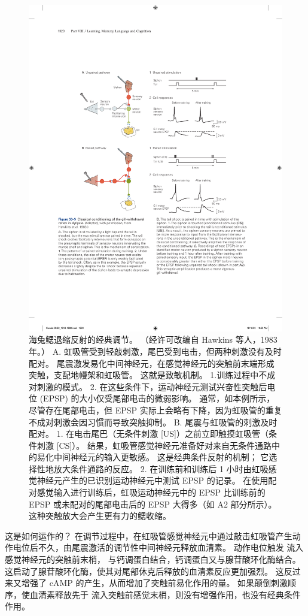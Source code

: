 \begin{figure}[htbp]
	\centering
	\includegraphics[width=0.75\linewidth]{chap53/fig_53_5}
	\caption{海兔鳃退缩反射的经典调节。 （经许可改编自 Hawkins 等人，1983 年。） A. 虹吸管受到轻敲刺激，尾巴受到电击，但两种刺激没有及时配对。 尾震激发易化中间神经元，在感觉神经元的突触前末端形成突触，支配地幔架和虹吸管。 这就是致敏机制。 1.训练过程中不成对刺激的模式。 2. 在这些条件下，运动神经元测试兴奋性突触后电位 (EPSP) 的大小仅受尾部电击的微弱影响。 通常，如本例所示，尽管存在尾部电击，但 EPSP 实际上会略有下降，因为虹吸管的重复不成对刺激会因习惯而导致突触抑制。 B. 尾震与虹吸管的刺激及时配对。 1. 在电击尾巴（无条件刺激 [US]）之前立即触摸虹吸管（条件刺激 [CS]）。 结果，虹吸管感觉神经元准备好对来自无条件通路中的易化中间神经元的输入更敏感。 这是经典条件反射的机制； 它选择性地放大条件通路的反应。 2. 在训练前和训练后 1 小时由虹吸感觉神经元产生的已识别运动神经元中测试 EPSP 的记录。 在使用配对感觉输入进行训练后，虹吸运动神经元中的 EPSP 比训练前的 EPSP 或未配对的尾部电击后的 EPSP 大得多（如 A2 部分所示）。 这种突触放大会产生更有力的鳃收缩。}
	\label{fig:53_5}
\end{figure}


这是如何运作的？
在调节过程中，在虹吸管感觉神经元中通过敲击虹吸管产生动作电位后不久，由尾震激活的调节性中间神经元释放血清素。
动作电位触发  流入感觉神经元的突触前末梢， 与钙调蛋白结合，钙调蛋白又与腺苷酸环化酶结合。
这启动了腺苷酸环化酶，使其对尾部休克后释放的血清素反应更加强烈。
这反过来又增强了 cAMP 的产生，从而增加了突触前易化作用的量。
如果颠倒刺激顺序，使血清素释放先于  流入突触前感觉末梢，则没有增强作用，也没有经典条件作用。



